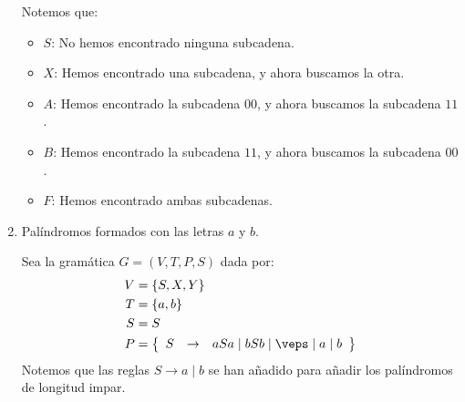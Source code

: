 \begin{ejercicio}
\begin{enumerate}
        Notemos que:
        \begin{itemize}
            \item $S$: No hemos encontrado ninguna subcadena.
            \item $X$: Hemos encontrado una subcadena, y ahora buscamos la otra.
            \item $A$: Hemos encontrado la subcadena $00$, y ahora buscamos la subcadena $11$.
            \item $B$: Hemos encontrado la subcadena $11$, y ahora buscamos la subcadena $00$.
            \item $F$: Hemos encontrado ambas subcadenas.
        \end{itemize}
        
        \item Palíndromos formados con las letras $a$ y $b$.
        
        Sea la gramática $G=\left(V,T,P,S\right)$ dada por:
        \begin{align*}
            V &= \{S, X, Y\} \\
            T &= \{a,b\} \\
            S &= S \\
            P &= \left\{
                \begin{array}{rcl}
                    S &\rightarrow & aSa \mid bSb \mid \veps \mid a \mid b
                \end{array}
            \right\}
        \end{align*}
        Notemos que las reglas $S\rightarrow a\mid b$ se han añadido para añadir los palíndromos de longitud impar.
    \end{enumerate}
\end{ejercicio}

